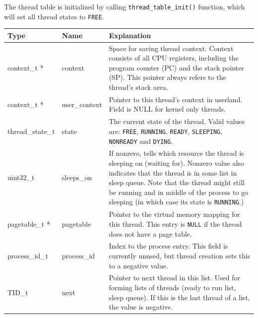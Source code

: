 \documentclass[twoside,a4paper]{report}
\newcommand{\PBS}[1]{\let\temp=\\#1\let\\=\temp}
\newlength{\tablewidth}
\begin{document}

The thread table is initialized by calling
\texttt{thread\_table\_init()} function, which will set all thread
states to \texttt{FREE}.

\begin{table}
\begin{center}
\begin{tabularx}{\tablewidth}{l|l|>{\PBS\raggedright}X}
\textbf{Type}     & \textbf{Name}    & \textbf{Explanation} \\
\hline

context\_t * & context & Space for saving thread context. Context
consists of all CPU registers, including the program counter (PC) and
the stack pointer (SP). This pointer always refers to the thread's
stack area.\\

\hline

context\_t * & user\_context & Pointer to this thread's context in
userland. Field is NULL for kernel only threads. \\

\hline

thread\_state\_t & state & The current state of the thread. Valid
values are: \texttt{FREE}, \texttt{RUNNING}, \texttt{READY},
\texttt{SLEEPING}, \texttt{NONREADY} and \texttt{DYING}. \\

\hline

uint32\_t & sleeps\_on & If nonzero, tells which resource the
thread is sleeping on (waiting for). Nonzero value also indicates that
the thread is in some list in sleep queue. Note that the thread might
still be running and in middle of the process to go sleeping (in
which case its state is \texttt{RUNNING}.) \\

\hline

pagetable\_t * & pagetable & Pointer to the virtual memory mapping for
this thread. This entry is \texttt{NULL} if the thread does not have a
page table.\\

\hline

process\_id\_t & process\_id & Index to the process entry. This field
is currently unused, but thread creation sets this to a negative
value. \\

\hline

TID\_t & next & Pointer to next thread in this list. Used for forming
lists of threads (ready to run list, sleep queue). If this is the last
thread of a list, the value is negative. \\


\end{tabularx}
\end{center}
\end{table}
\end{document}
